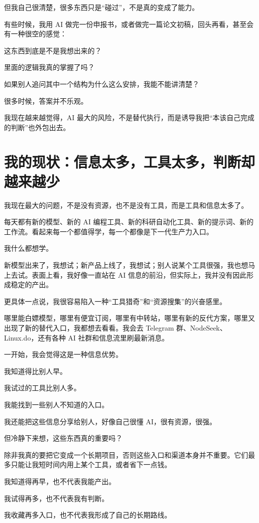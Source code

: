 \documentclass[UTF8,zihao=-4,a4paper]{ctexart}
\begin{document}
但我自己很清楚，很多东西只是“碰过”，不是真的变成了能力。

有些时候，我用 AI 做完一份申报书，或者做完一篇论文初稿，回头再看，甚至会有一种很空的感觉：

\begin{leadbox}
这东西到底是不是我想出来的？\par
里面的逻辑我真的掌握了吗？\par
如果别人追问其中一个结构为什么这么安排，我能不能讲清楚？
\end{leadbox}

很多时候，答案并不乐观。

我现在越来越觉得，AI 最大的风险，不是替代执行，而是诱导我把“本该自己完成的判断”也外包出去。

\section{我的现状：信息太多，工具太多，判断却越来越少}
我现在最大的问题，不是没有资源，也不是没有工具，而是工具和信息太多了。

每天都有新的模型、新的 AI 编程工具、新的科研自动化工具、新的提示词、新的工作流。看起来每一个都值得学，每一个都像是下一代生产力入口。

我什么都想学。

新模型出来了，我想试；新产品上线了，我想试；别人说某个工具很强，我也想马上去试。表面上看，我好像一直站在 AI 信息的前沿，但实际上，我并没有因此形成稳定的产出。

更具体一点说，我很容易陷入一种“工具猎奇”和“资源搜集”的兴奋感里。

哪里能白嫖模型，哪里有便宜订阅，哪里有中转站，哪里有新的反代方案，哪里又出现了新的替代入口，我都想去看看。我会去 Telegram 群、NodeSeek、Linux.do，还有各种 AI 社群和信息流里刷最新消息。

一开始，我会觉得这是一种信息优势。

我知道得比别人早。\par
我试过的工具比别人多。\par
我能找到一些别人不知道的入口。\par
我还能把这些信息分享给别人，好像自己很懂 AI，很有资源，很强。

但冷静下来想，这些东西真的重要吗？

除非我真的要把它变成一个长期项目，否则这些入口和渠道本身并不重要。它们最多只能让我短时间内用上某个工具，或者省下一点钱。

我知道得再早，也不代表我能产出。\par
我试得再多，也不代表我有判断。\par
我收藏再多入口，也不代表我形成了自己的长期路线。
\end{document}
